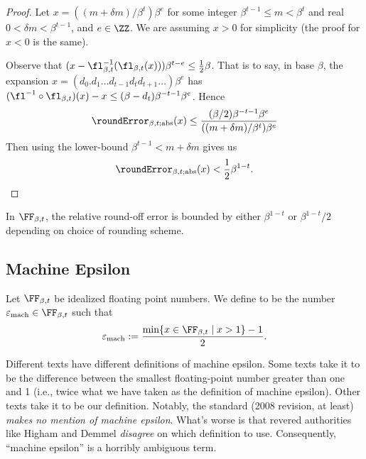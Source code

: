 \begin{proof}
Let $x=((m+\delta m)/\beta^{t})\beta^{e}$ for some integer $\beta^{t-1}\leq m<\beta^{t}$
and real $0<\delta m<\beta^{t-1}$, and $e\in\ZZ$. We are assuming $x>0$
for simplicity (the proof for $x<0$ is the same).

Observe that $(x - \fl^{-1}_{\beta,t}(\fl_{\beta,t}(x)))\beta^{t-e}\leq \frac{1}{2}\beta$.
That is to say, in base $\beta$, the expansion $x = (d_{0}.d_{1}\dots d_{t-1}d_{t}d_{t+1}\dots)\beta^{e}$
has $(\fl^{-1}\circ\fl_{\beta,t})(x) - x\leq (\beta -d_{t})\beta^{-t-1}\beta^{e}$. Hence
\begin{equation}
  \roundError_{\beta,t;\text{abs}}(x)\leq
  \frac{(\beta/2)\beta^{-t-1}\beta^{e}}{((m+\delta m)/\beta^{t})\beta^{e}}
\end{equation}
Then using the lower-bound $\beta^{t-1}< m+\delta m$ gives us
\begin{equation*}
  \roundError_{\beta,t;\text{abs}}(x) < \frac{1}{2}\beta^{1-t}.\qedhere
\end{equation*}
\end{proof}


\begin{thm}
  In $\FF_{\beta,t}$, the relative round-off error is bounded by either
  $\beta^{1-t}$ or $\beta^{1-t}/2$ depending on choice of rounding scheme.
\end{thm}

\subsection{Machine Epsilon}

\begin{defn}\label{defn:idealized:machine-epsilon}
Let $\FF_{\beta,t}$ be idealized floating point numbers. We define
 to be the number
$\varepsilon_{\text{mach}}\in\FF_{\beta,t}$ such that
\begin{equation}
\varepsilon_{\text{mach}} := \frac{\min\{x\in\FF_{\beta,t}\mid x>1\}-1}{2}.
\end{equation}
\end{defn}

\begin{ddanger}
  Different texts have different definitions of machine epsilon. Some
  texts take it to be the difference between the smallest floating-point
  number greater than one and 1 (i.e., twice what we have taken as the
  definition of machine epsilon). Other texts take it to be our
  definition. Notably, the  standard (2008 revision, at least)
  \emph{makes no mention of machine epsilon}. What's worse is that
  revered authorities like Higham and Demmel \emph{disagree} on which
  definition to use. Consequently, ``machine epsilon'' is a horribly
  ambiguous term.
\end{ddanger}

